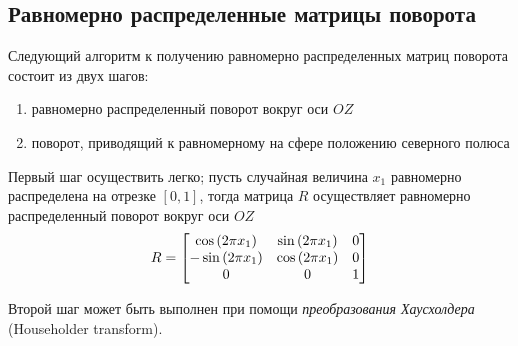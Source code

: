 \subsection{Равномерно распределенные матрицы поворота}

Следующий алгоритм к получению равномерно распределенных матриц поворота состоит из двух шагов:
\begin{enumerate}
\item равномерно распределенный поворот вокруг оси $OZ$
\item поворот, приводящий к равномерному на сфере положению северного полюса
\end{enumerate} 

Первый шаг осуществить легко; пусть случайная величина $x_1$ равномерно распределена на отрезке $[0, 1]$, тогда матрица $R$ осуществляет равномерно распределенный поворот вокруг оси $OZ$ 
\begin{gather}
R =
\begin{bmatrix}
\cos \left( 2 \pi x_1 \right) & \sin \left( 2 \pi x_1 \right) & 0 \\
- \sin \left( 2 \pi x_1 \right) & \cos \left( 2 \pi x_1 \right) & 0 \\
0 & 0 & 1
\end{bmatrix} \label{rmatrix} 
\end{gather}

Второй шаг может быть выполнен при помощи \textit{преобразования Хаусхолдера} (Householder transform).

